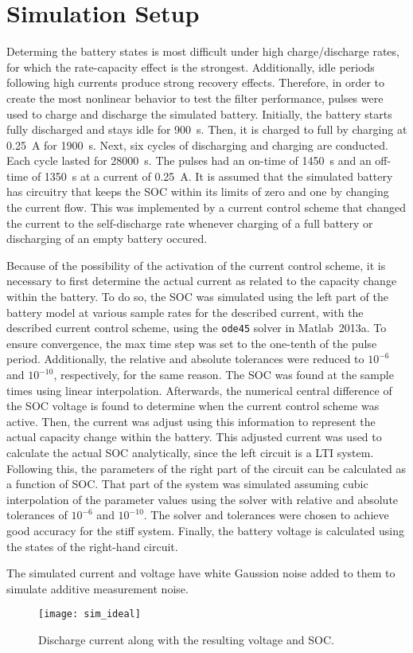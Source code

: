 \documentclass[../zhang_thesis.tex]{subfiles}
\begin{document}
\section{Simulation Setup}

Determing the battery states is most difficult under high charge/discharge rates, for which the rate-capacity effect is the strongest. Additionally, idle periods following high currents produce strong recovery effects. Therefore, in order to create the most nonlinear behavior to test the filter performance, pulses were used to charge and discharge the simulated battery. Initially, the battery starts fully discharged and stays idle for 900~s. Then, it is charged to full by charging at 0.25~A for
1900~s. Next, six cycles of discharging and charging are conducted. Each cycle lasted for 28000~s. The pulses had an on-time of 1450~s and an off-time of 1350~s at a current of 0.25~A. It is assumed that the simulated battery has circuitry that keeps the SOC within its limits of zero and one by changing the current flow. This was implemented by a current control scheme that changed the current to the self-discharge rate whenever charging of a full battery or discharging of an empty battery occured.

Because of the possibility of the activation of the current control scheme, it is necessary to first determine the actual current as related to the capacity change within the battery. To do so, the SOC was simulated using the left part of the battery model at various sample rates for the described current, with the described current control scheme, using the \texttt{ode45} solver in Matlab~2013a. To ensure convergence, the max time step was set to the one-tenth of the pulse period.
Additionally, the relative and absolute tolerances were reduced to $10^{-6}$ and $10^{-10}$, respectively, for the same reason. The SOC was found at the sample times using linear interpolation. Afterwards, the numerical central difference of the SOC voltage is found to determine when the current control scheme was active. Then, the current was adjust using this information to represent the actual capacity change within the battery. This adjusted current was used to calculate the actual
SOC analytically, since the left circuit is a LTI system. Following this, the parameters of the right part of the circuit can be calculated as a function of SOC. That part of the system was simulated assuming cubic interpolation of the parameter values using the  solver with relative and absolute tolerances of $10^{-6}$ and $10^{-10}$. The solver and tolerances were chosen to achieve good accuracy for the stiff system. Finally, the battery voltage is calculated using the
states of the right-hand circuit.

The simulated current and voltage have white Gaussion noise added to them to simulate additive measurement noise.

\begin{figure}
\centering
\texttt{[image: sim\_ideal]}
\caption{Discharge current along with the resulting voltage and SOC.}
\label{fig:idealsim}
\end{figure}
\end{document}
